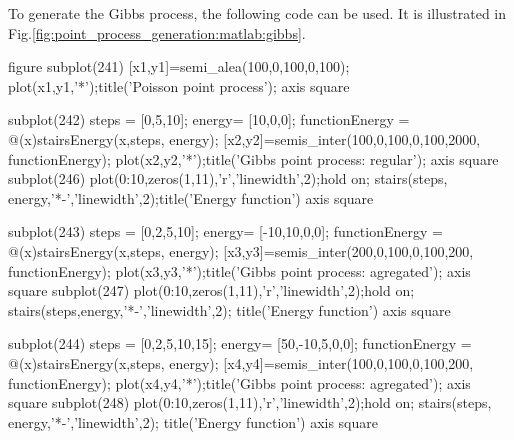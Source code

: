 To generate the Gibbs process, the following code can be used. It is illustrated in 
Fig.\ref{fig:point_process_generation:matlab:gibbs}.
\begin{matlab}
figure
subplot(241)
[x1,y1]=semi_alea(100,0,100,0,100);
plot(x1,y1,'*');title('Poisson point process');
axis square

subplot(242)
steps = [0,5,10];
energy= [10,0,0];
functionEnergy = @(x)stairsEnergy(x,steps, energy);
[x2,y2]=semis_inter(100,0,100,0,100,2000, functionEnergy);
plot(x2,y2,'*');title('Gibbs point process: regular');
axis square
subplot(246)
plot(0:10,zeros(1,11),'r','linewidth',2);hold on; 
stairs(steps, energy,'*-','linewidth',2);title('Energy function')
axis square

subplot(243)
steps = [0,2,5,10];
energy= [-10,10,0,0];
functionEnergy = @(x)stairsEnergy(x,steps, energy);
[x3,y3]=semis_inter(200,0,100,0,100,200, functionEnergy);
plot(x3,y3,'*');title('Gibbs point process: agregated');
axis square
subplot(247)
plot(0:10,zeros(1,11),'r','linewidth',2);hold on;
stairs(steps,energy,'*-','linewidth',2); title('Energy function')
axis square

subplot(244)
steps = [0,2,5,10,15];
energy= [50,-10,5,0,0];
functionEnergy = @(x)stairsEnergy(x,steps, energy);
[x4,y4]=semis_inter(100,0,100,0,100,200, functionEnergy);
plot(x4,y4,'*');title('Gibbs point process: agregated');
axis square
subplot(248)
plot(0:10,zeros(1,11),'r','linewidth',2);hold on;
stairs(steps, energy,'*-','linewidth',2); title('Energy function')
axis square
\end{matlab}

